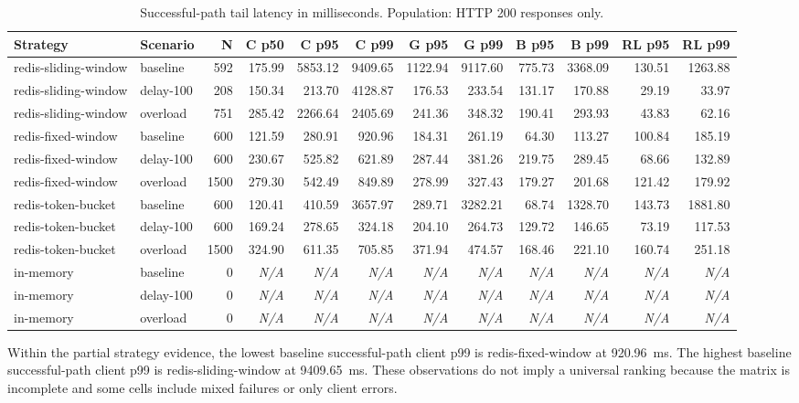 \documentclass[conference]{IEEEtran}
\newcommand{\na}{\textit{N/A}}
\newcommand{\ms}{ms}
\begin{document}
\begin{table}[t]
\centering
\tiny
\caption{Successful-path tail latency in milliseconds. Population: HTTP 200 responses only.}
\label{tab:success}
\begin{tabular}{llrrrrrrrrrr}
\hline
Strategy & Scenario & N & C p50 & C p95 & C p99 & G p95 & G p99 & B p95 & B p99 & RL p95 & RL p99 \\
\hline
redis-sliding-window & baseline & 592 & 175.99 & 5853.12 & 9409.65 & 1122.94 & 9117.60 & 775.73 & 3368.09 & 130.51 & 1263.88 \\
redis-sliding-window & delay-100 & 208 & 150.34 & 213.70 & 4128.87 & 176.53 & 233.54 & 131.17 & 170.88 & 29.19 & 33.97 \\
redis-sliding-window & overload & 751 & 285.42 & 2266.64 & 2405.69 & 241.36 & 348.32 & 190.41 & 293.93 & 43.83 & 62.16 \\
redis-fixed-window & baseline & 600 & 121.59 & 280.91 & 920.96 & 184.31 & 261.19 & 64.30 & 113.27 & 100.84 & 185.19 \\
redis-fixed-window & delay-100 & 600 & 230.67 & 525.82 & 621.89 & 287.44 & 381.26 & 219.75 & 289.45 & 68.66 & 132.89 \\
redis-fixed-window & overload & 1500 & 279.30 & 542.49 & 849.89 & 278.99 & 327.43 & 179.27 & 201.68 & 121.42 & 179.92 \\
redis-token-bucket & baseline & 600 & 120.41 & 410.59 & 3657.97 & 289.71 & 3282.21 & 68.74 & 1328.70 & 143.73 & 1881.80 \\
redis-token-bucket & delay-100 & 600 & 169.24 & 278.65 & 324.18 & 204.10 & 264.73 & 129.72 & 146.65 & 73.19 & 117.53 \\
redis-token-bucket & overload & 1500 & 324.90 & 611.35 & 705.85 & 371.94 & 474.57 & 168.46 & 221.10 & 160.74 & 251.18 \\
in-memory & baseline & 0 & \na & \na & \na & \na & \na & \na & \na & \na & \na \\
in-memory & delay-100 & 0 & \na & \na & \na & \na & \na & \na & \na & \na & \na \\
in-memory & overload & 0 & \na & \na & \na & \na & \na & \na & \na & \na & \na \\
\hline
\end{tabular}
\end{table}

Within the partial strategy evidence, the lowest baseline successful-path client p99 is redis-fixed-window at 920.96~\ms. The highest baseline successful-path client p99 is redis-sliding-window at 9409.65~\ms. These observations do not imply a universal ranking because the matrix is incomplete and some cells include mixed failures or only client errors.
\end{document}
